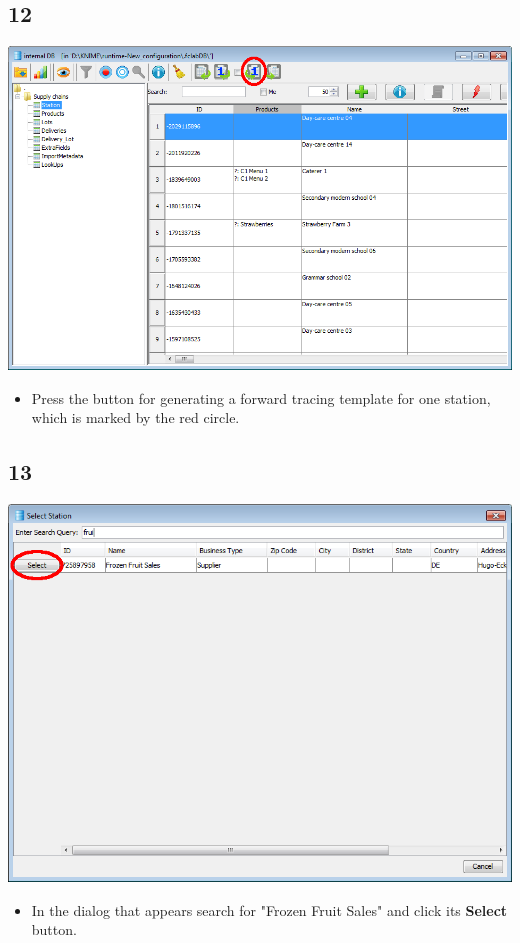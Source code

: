 \documentclass{beamer}
\begin{document}
\subsection{12}
\begin{frame}
	\begin{center}
  		\includegraphics[height=0.6\textheight]{12.png}
	\end{center}
	\begin{itemize}
		\item Press the button for generating a forward tracing template for one station, which is marked by the red circle.
	\end{itemize}
\end{frame}

\subsection{13}
\begin{frame}
	\begin{center}
  		\includegraphics[height=0.6\textheight]{13.png}
	\end{center}
	\begin{itemize}
		\item In the dialog that appears search for "Frozen Fruit Sales" and click its \textbf{Select} button.
	\end{itemize}
\end{frame}
\end{document}
